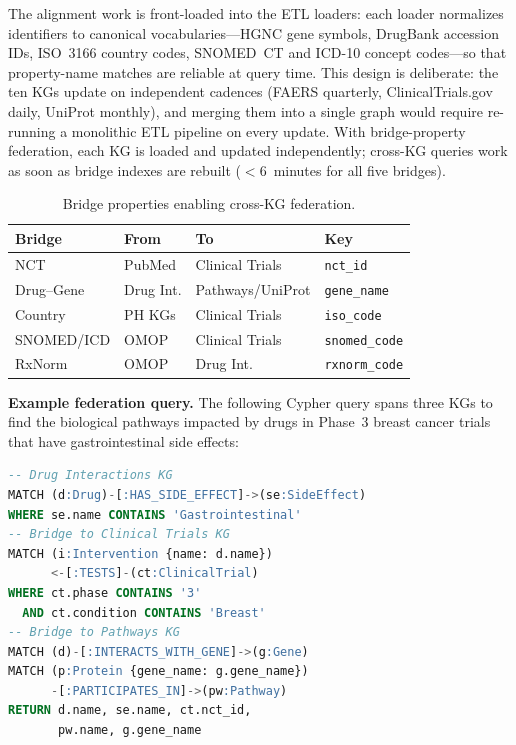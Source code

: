 \documentclass[runningheads]{llncs}
\begin{document}
The alignment work is front-loaded into the ETL loaders: each loader
normalizes identifiers to canonical vocabularies---HGNC gene symbols,
DrugBank accession IDs, ISO~3166 country codes, SNOMED~CT and
ICD-10 concept codes---so that property-name matches are reliable
at query time.  This design is deliberate: the ten KGs update on
independent cadences (FAERS quarterly, ClinicalTrials.gov daily,
UniProt monthly), and merging them into a single graph would require
re-running a monolithic ETL pipeline on every update.  With
bridge-property federation, each KG is loaded and updated
independently; cross-KG queries work as soon as bridge indexes
are rebuilt ($<$6~minutes for all five bridges).

\begin{table}[t]
\centering
\caption{Bridge properties enabling cross-KG federation.}
\label{tab:bridges}
\small
\begin{tabular}{@{}llll@{}}
\toprule
\textbf{Bridge} & \textbf{From} & \textbf{To} & \textbf{Key} \\
\midrule
NCT           & PubMed     & Clinical Trials & \texttt{nct\_id} \\
Drug--Gene    & Drug Int.  & Pathways/UniProt & \texttt{gene\_name} \\
Country       & PH KGs     & Clinical Trials  & \texttt{iso\_code} \\
SNOMED/ICD    & OMOP       & Clinical Trials  & \texttt{snomed\_code} \\
RxNorm        & OMOP       & Drug Int.        & \texttt{rxnorm\_code} \\
\bottomrule
\end{tabular}
\end{table}

\noindent\textbf{Example federation query.}  The following Cypher
query spans three KGs to find the biological pathways impacted by
drugs in Phase~3 breast cancer trials that have gastrointestinal
side effects:

\begin{lstlisting}[language=SQL]
-- Drug Interactions KG
MATCH (d:Drug)-[:HAS_SIDE_EFFECT]->(se:SideEffect)
WHERE se.name CONTAINS 'Gastrointestinal'
-- Bridge to Clinical Trials KG
MATCH (i:Intervention {name: d.name})
      <-[:TESTS]-(ct:ClinicalTrial)
WHERE ct.phase CONTAINS '3'
  AND ct.condition CONTAINS 'Breast'
-- Bridge to Pathways KG
MATCH (d)-[:INTERACTS_WITH_GENE]->(g:Gene)
MATCH (p:Protein {gene_name: g.gene_name})
      -[:PARTICIPATES_IN]->(pw:Pathway)
RETURN d.name, se.name, ct.nct_id,
       pw.name, g.gene_name
\end{lstlisting}
\end{document}
